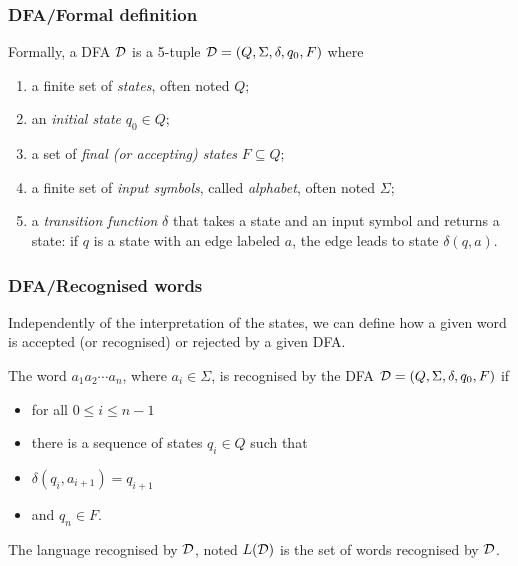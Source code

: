 % 
\begin{frame}
\frametitle{DFA/Formal definition}
 
Formally, a DFA \({\cal D}\) is a 5-tuple \({\cal D} = (Q, \Sigma,
\delta, q_0, F)\) where
\begin{enumerate}

  \item a finite set of \emph{states}, often noted \(Q\);

  \item an \emph{initial state} \(q_0 \in Q\);

  \item a set of \emph{final (\emph{or} accepting)
  states} \(F \subseteq Q\);

  \item a finite set of \emph{input symbols}, called \emph{alphabet},
    often noted \(\Sigma\);

  \item a \emph{transition function} \(\delta\) that takes 
  a state and an input symbol and returns a state: if \(q\) is a state
  with an edge labeled \(a\), the edge leads to state \(\delta(q,
  a)\).

\end{enumerate}

\end{frame}

% 
\begin{frame}
\frametitle{DFA/Recognised words}

Independently of the interpretation of the states, we can define how a
given word is accepted (or recognised) or rejected by a given DFA.

\bigskip

The word \(a_1 a_2 \cdots a_n\), where \(a_i \in \Sigma\), is
recognised by the DFA \({\cal D} = (Q, \Sigma, \delta, q_0, F)\) if
\begin{itemize}

  \item for all \(0 \leqslant i \leqslant n-1\)

  \item there is a sequence of states \(q_i \in Q\) such that

  \item \(\delta (q_i, a_{i+1}) = q_{i+1}\) 

  \item and \(q_n \in F\).

\end{itemize}
The language recognised by \(\cal D\), noted \(L({\cal D})\) is the
set of words recognised by \(\cal D\).

\end{frame}

